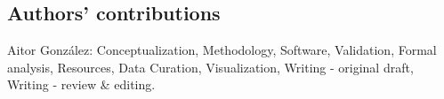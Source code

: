 \begin{backmatter}
    \section*{Authors' contributions}
    Aitor González: Conceptualization, Methodology, Software, Validation, Formal analysis, Resources, Data Curation, Visualization, Writing - original draft, Writing - review \& editing.







\end{backmatter}
